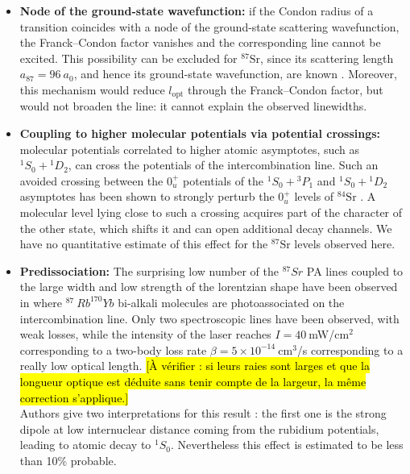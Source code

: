 \begin{itemize}
    \item \textbf{Node of the ground-state wavefunction:} if the Condon radius of a
    transition coincides with a node of the ground-state scattering wavefunction, the
    Franck--Condon factor vanishes and the corresponding line cannot be excited. This
    possibility can be excluded for $^{87}\text{Sr}$, since its scattering length
    $a_{87}=96~a_0$, and hence its ground-state wavefunction, are known
    \cite{hill_photoassociative_2021}. Moreover, this mechanism would reduce $l_{\text{opt}}$
    through the Franck--Condon factor, but would not broaden the line: it cannot explain the
    observed linewidths.        
    \item \textbf{Coupling to higher molecular potentials via potential crossings:} molecular
    potentials correlated to higher atomic asymptotes, such as $^1S_0+{}^1D_2$, can cross the
    potentials of the intercombination line. Such an avoided crossing between the $0_u^+$
    potentials of the $^1S_0+{}^3P_1$ and $^1S_0+{}^1D_2$ asymptotes has been shown to strongly
    perturb the $0_u^+$ levels of $^{84}\text{Sr}$ \cite{borkowski_mass_2014,reschovsky_narrow-line_2018}.
    A molecular level lying close to such a crossing acquires part of the character of the
    other state, which shifts it and can open additional decay channels. We have no
    quantitative estimate of this effect for the $^{87}\text{Sr}$ levels observed here.
    \item \textbf{Predissociation:} The surprising low number of the $^{87}Sr$ PA lines coupled to the large width and low strength of the lorentzian shape have been observed in \cite{franzen_intercombination_2023} where $^{87}~Rb^{170}Yb$ bi-alkali 
        molecules are photoassociated on the intercombination line. 
        Only two spectroscopic lines have been observed, with weak losses, while the intensity of the laser reaches $I = 40~$mW/cm$^2$ corresponding to a two-body loss rate $\beta = 5\times 10^{-14}~$cm$^3$/s 
        corresponding to a really low optical length. \hl{[À vérifier : si leurs raies sont larges et que la longueur optique est déduite sans tenir compte de la largeur, la même correction s'applique.]}\\

        Authors give two interpretations for this result : the first one is the strong dipole at low internuclear distance coming from the rubidium potentials, leading to atomic decay to $^1S_0$. Nevertheless this effect 
        is estimated to be less than 10\% probable.  \\


\end{itemize}

